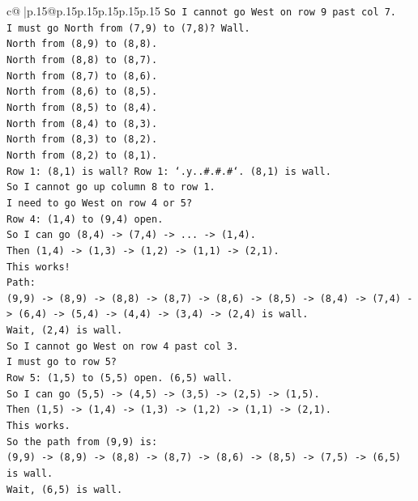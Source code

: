 \documentclass{article}
\begin{document}
{\begin{supertabular}{c@{$\;$}|p{.15\linewidth}@{}p{.15\linewidth}p{.15\linewidth}p{.15\linewidth}p{.15\linewidth}p{.15\linewidth}}
{{{\texttt{So I cannot go West on row 9 past col 7.} \\
\texttt{I must go North from (7,9) to (7,8)? Wall.} \\
\texttt{North from (8,9) to (8,8).} \\
\texttt{North from (8,8) to (8,7).} \\
\texttt{North from (8,7) to (8,6).} \\
\texttt{North from (8,6) to (8,5).} \\
\texttt{North from (8,5) to (8,4).} \\
\texttt{North from (8,4) to (8,3).} \\
\texttt{North from (8,3) to (8,2).} \\
\texttt{North from (8,2) to (8,1).} \\
\texttt{Row 1: (8,1) is wall? Row 1: `.y..\#.\#.\#`. (8,1) is wall.} \\
\texttt{So I cannot go up column 8 to row 1.} \\
\texttt{I need to go West on row 4 or 5?} \\
\texttt{Row 4: (1,4) to (9,4) open.} \\
\texttt{So I can go (8,4) {-}> (7,4) {-}> ... {-}> (1,4).} \\
\texttt{Then (1,4) {-}> (1,3) {-}> (1,2) {-}> (1,1) {-}> (2,1).} \\
\texttt{This works!} \\
\texttt{Path:} \\
\texttt{(9,9) {-}> (8,9) {-}> (8,8) {-}> (8,7) {-}> (8,6) {-}> (8,5) {-}> (8,4) {-}> (7,4) {-}> (6,4) {-}> (5,4) {-}> (4,4) {-}> (3,4) {-}> (2,4) is wall.} \\
\texttt{Wait, (2,4) is wall.} \\
\texttt{So I cannot go West on row 4 past col 3.} \\
\texttt{I must go to row 5?} \\
\texttt{Row 5: (1,5) to (5,5) open. (6,5) wall.} \\
\texttt{So I can go (5,5) {-}> (4,5) {-}> (3,5) {-}> (2,5) {-}> (1,5).} \\
\texttt{Then (1,5) {-}> (1,4) {-}> (1,3) {-}> (1,2) {-}> (1,1) {-}> (2,1).} \\
\texttt{This works.} \\
\texttt{So the path from (9,9) is:} \\
\texttt{(9,9) {-}> (8,9) {-}> (8,8) {-}> (8,7) {-}> (8,6) {-}> (8,5) {-}> (7,5) {-}> (6,5) is wall.} \\
\texttt{Wait, (6,5) is wall.} \\
}}}
\end{supertabular}}
\end{document}

